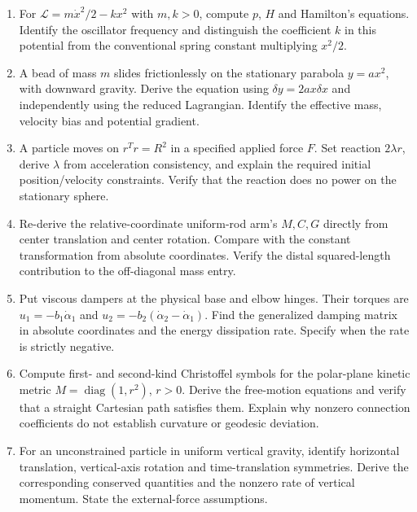 \begin{enumerate}
\item\label{ex:lagrangian_8} For $\mathcal L=m\dot x^2/2-kx^2$ with $m,k>0$, compute $p$, $H$ and Hamilton's equations. Identify the oscillator frequency and distinguish the coefficient $k$ in this potential from the conventional spring constant multiplying $x^2/2$.

\item\label{ex:lagrangian_9} A bead of mass $m$ slides frictionlessly on the stationary parabola $y=ax^2$, with downward gravity. Derive the equation using $\delta y=2ax\delta x$ and independently using the reduced Lagrangian. Identify the effective mass, velocity bias and potential gradient.

\item\label{ex:lagrangian_10} A particle moves on $r^Tr=R^2$ in a specified applied force $F$. Set reaction $2\lambda r$, derive $\lambda$ from acceleration consistency, and explain the required initial position/velocity constraints. Verify that the reaction does no power on the stationary sphere.

\item\label{ex:lagrangian_11} Re-derive the relative-coordinate uniform-rod arm's $M,C,G$ directly from center translation and center rotation. Compare with the constant transformation from absolute coordinates. Verify the distal squared-length contribution to the off-diagonal mass entry.

\item\label{ex:lagrangian_12} Put viscous dampers at the physical base and elbow hinges. Their torques are $u_1=-b_1\dot\alpha_1$ and $u_2=-b_2(\dot\alpha_2-\dot\alpha_1)$. Find the generalized damping matrix in absolute coordinates and the energy dissipation rate. Specify when the rate is strictly negative.

\item\label{ex:lagrangian_13} Compute first- and second-kind Christoffel symbols for the polar-plane kinetic metric $M=\operatorname{diag}(1,r^2)$, $r>0$. Derive the free-motion equations and verify that a straight Cartesian path satisfies them. Explain why nonzero connection coefficients do not establish curvature or geodesic deviation.

\item\label{ex:lagrangian_14} For an unconstrained particle in uniform vertical gravity, identify horizontal translation, vertical-axis rotation and time-translation symmetries. Derive the corresponding conserved quantities and the nonzero rate of vertical momentum. State the external-force assumptions.


\end{enumerate}
